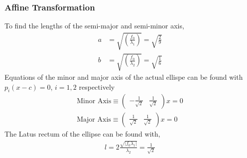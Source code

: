 \documentclass{beamer}
\providecommand{\brak}[1]{\ensuremath{\left(#1\right)}}
\theoremstyle{remark}
\newcommand{\myvec}[1]{\ensuremath{\begin{pmatrix}#1\end{pmatrix}}}
\numberwithin{equation}{section}
\begin{document}
\begin{frame}
	\frametitle{Affine Transformation}
To find the lengths of the semi-major and semi-minor axis, 
	\begin{align}
		a &= \sqrt{\brak{\frac{f_0}{\lambda_1}}} =  \sqrt{\frac{2}{9}}\\
		b &= \sqrt{\brak{\frac{f_0}{\lambda_2}}} = \sqrt{\frac{1}{6}}
	\end{align}
	Equations of the minor and major axis of the actual ellispe can be found with $p_i(x - c) = 0$, $i = 1, 2$ respectively \\ 
	\begin{align}
		\text{Minor Axis} \equiv   \myvec{- \frac{1}{\sqrt{2}} & \frac{1}{\sqrt{2}}}x = 0\\
		\text{Major Axis} \equiv   \myvec{\frac{1}{\sqrt{2}} & \frac{1}{\sqrt{2}}}x = 0
	\end{align}
	The Latus rectum of the ellipse can be found with,
	\begin{align}
		l = 2\frac{\sqrt{|f_0 \lambda_1|}}{\lambda_2} = \frac{1}{\sqrt{2}}
	\end{align}
\end{frame}
\end{document}
